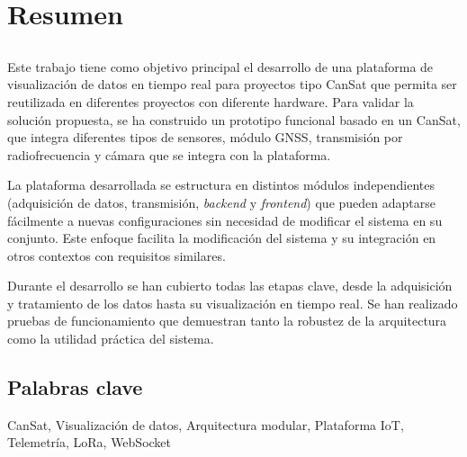 \chapter*{Resumen}


\section*{\titulo}

Este trabajo tiene como objetivo principal el desarrollo de una plataforma de visualización de datos en tiempo real para proyectos tipo CanSat que permita ser reutilizada en diferentes proyectos con diferente hardware.
Para validar la solución propuesta, se ha construido un prototipo funcional basado en un CanSat, que integra diferentes tipos de sensores, módulo GNSS, transmisión por radiofrecuencia y cámara que  se integra con la plataforma.

La plataforma desarrollada se estructura en distintos módulos independientes (adquisición de datos, transmisión, \emph{backend} y \emph{frontend}) que pueden adaptarse fácilmente a nuevas configuraciones sin necesidad de modificar el sistema en su conjunto.
Este enfoque facilita la modificación del sistema y su integración en otros contextos con requisitos similares.

Durante el desarrollo se han cubierto todas las etapas clave, desde la adquisición y tratamiento de los datos hasta su visualización en tiempo real.
Se han realizado pruebas de funcionamiento que demuestran tanto la robustez de la arquitectura como la utilidad práctica del sistema.


\section*{Palabras clave}

\noindent CanSat, Visualización de datos, Arquitectura modular, Plataforma IoT, Telemetría, LoRa, WebSocket


   


